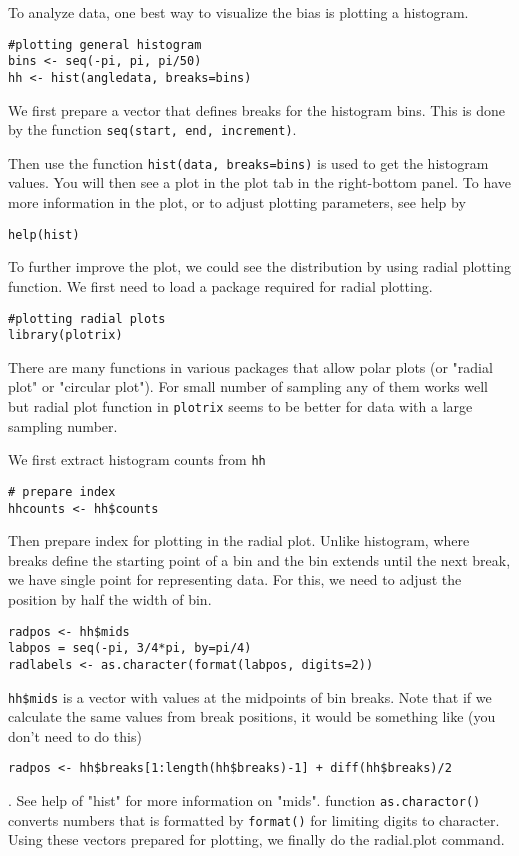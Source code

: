 \documentclass[11pnt]{article}
\begin{document}
\begin{description}
To analyze data, one best way to visualize the bias is plotting a histogram. 
\begin{verbatim}
#plotting general histogram
bins <- seq(-pi, pi, pi/50)
hh <- hist(angledata, breaks=bins)
\end{verbatim}
We first prepare a vector that defines breaks for the histogram bins. This is done by the function \verb"seq(start, end, increment)".

Then use the function \verb"hist(data, breaks=bins)" is used to get the histogram values. You will then see a plot in the plot tab in the right-bottom panel. To have more information in the plot, or to adjust plotting parameters, see help by
\begin{verbatim}
help(hist)
\end{verbatim}

To further improve the plot, we could see the distribution by using radial plotting function. We first need to load a package required for radial plotting. 
\begin{verbatim}
#plotting radial plots
library(plotrix)
\end{verbatim}
There are many functions in various packages that allow polar plots (or "radial plot" or "circular plot"). For small number of sampling any of them works well but radial plot function in \verb"plotrix" seems to be better for data with a large sampling number.  

We first extract histogram counts from \verb"hh"
\begin{verbatim}
# prepare index
hhcounts <- hh$counts
\end{verbatim}

Then prepare index for plotting in the radial plot. Unlike histogram, where breaks define the starting point of a bin and the bin extends until the next break, we have single point for representing data. For this, we need to adjust the position by half the width of bin. 
\begin{verbatim}
radpos <- hh$mids
labpos = seq(-pi, 3/4*pi, by=pi/4)
radlabels <- as.character(format(labpos, digits=2))
\end{verbatim}
\verb"hh$mids" is a vector with values at the midpoints of bin breaks. Note that if we calculate the same values from break positions, it would be something like (you don't need to do this) 
\begin{verbatim}
radpos <- hh$breaks[1:length(hh$breaks)-1] + diff(hh$breaks)/2
\end{verbatim}. 
See help of "hist" for more information on "mids". function \verb"as.charactor()" converts numbers that is formatted by \verb"format()" for limiting digits to character. Using these vectors prepared for plotting, we finally do the radial.plot command.  


\end{description}
\end{document}
